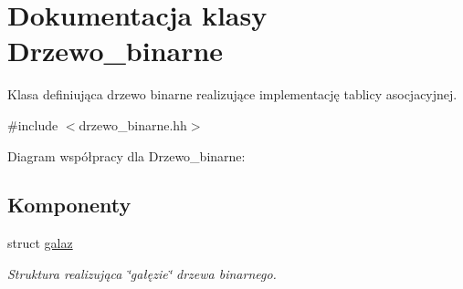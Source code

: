 \hypertarget{class_drzewo__binarne}{\section{\-Dokumentacja klasy \-Drzewo\-\_\-binarne}
\label{class_drzewo__binarne}
}


\-Klasa definiująca drzewo binarne realizujące implementację tablicy asocjacyjnej.  




{\ttfamily \#include $<$drzewo\-\_\-binarne.\-hh$>$}



\-Diagram współpracy dla \-Drzewo\-\_\-binarne\-:
\subsection*{\-Komponenty}
\begin{DoxyCompactItemize}
\item 
struct \hyperlink{struct_drzewo__binarne_1_1galaz}{galaz}
\begin{DoxyCompactList}\small\item\em \-Struktura realizująca \char`\"{}gałęzie\char`\"{} drzewa binarnego. \end{DoxyCompactList}\end{DoxyCompactItemize}
